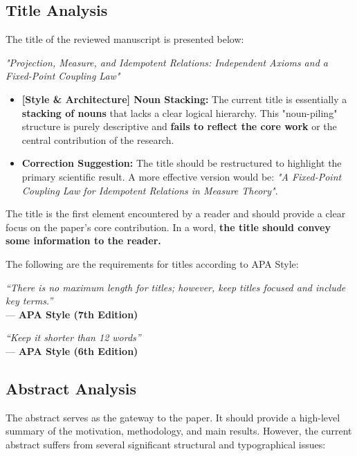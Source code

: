 \documentclass[11pt, a4paper]{article}
\begin{document}
\subsection{Title Analysis}


The title of the reviewed manuscript is presented below:

\begin{center}
    \textit{"Projection, Measure, and Idempotent Relations: Independent Axioms and a Fixed-Point Coupling Law"}
\end{center}

\begin{itemize}
    \item \textcolor{RustOrange}{\textbf{[Style \& Architecture] Noun Stacking:}} The current title is essentially a \textbf{stacking of nouns} that lacks a clear logical hierarchy. This "noun-piling" structure is purely descriptive and \textbf{fails to reflect the core work} or the central contribution of the research.
    
    \item \textbf{Correction Suggestion:} The title should be restructured to highlight the primary scientific result. A more effective version would be: \textit{"A Fixed-Point Coupling Law for Idempotent Relations in Measure Theory"}.
\end{itemize}
The title is the first element encountered by a reader and should provide a clear focus on the paper's core contribution.
In a word, \textbf{the title should convey some information to the reader.}

The following are the requirements for titles according to APA Style:
\begin{center}
    \small \textit{``There is no maximum length for titles; however, keep titles focused and include key terms.''} \\
    --- \textbf{APA Style (7th Edition)}
\end{center}
\begin{center}
    \small \textit{``Keep it shorter than 12 words''} \\
    --- \textbf{APA Style (6th Edition)}
\end{center}



\subsection{Abstract Analysis}
The abstract serves as the gateway to the paper. It should provide a high-level summary of the motivation, methodology, and main results. However, the current abstract suffers from several significant structural and typographical issues:
\end{document}
